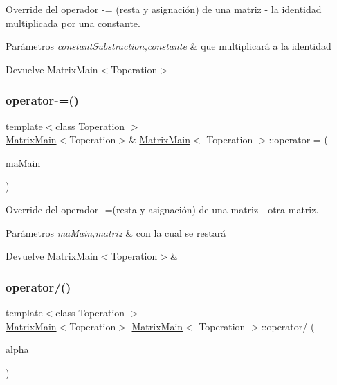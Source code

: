 Override del operador -\/= (resta y asignación) de una matriz -\/ la identidad multiplicada por una constante. 


\begin{DoxyParams}{Parámetros}
{\em constant\+Substraction,constante} & que multiplicará a la identidad \\
\hline
\end{DoxyParams}
\begin{DoxyReturn}{Devuelve}
Matrix\+Main$<$\+Toperation$>$ 
\end{DoxyReturn}
\mbox{\label{classMatrixMain_a9c12a483991f3b4d90f95e1ca09a4174}} 
\subsubsection{\texorpdfstring{operator-\/=()}{operator-=()}\hspace{0.1cm}{\footnotesize\ttfamily [2/2]}}
{\footnotesize\ttfamily template$<$class Toperation $>$ \\
\hyperlink{classMatrixMain}{Matrix\+Main}$<$Toperation$>$\& \hyperlink{classMatrixMain}{Matrix\+Main}$<$ Toperation $>$\+::operator-\/= (\begin{DoxyParamCaption}\item[{\hyperlink{classMatrixMain}{Matrix\+Main}$<$ Toperation $>$ \&}]{ma\+Main }\end{DoxyParamCaption})}



Override del operador -\/=(resta y asignación) de una matriz -\/ otra matriz. 


\begin{DoxyParams}{Parámetros}
{\em ma\+Main,matriz} & con la cual se restará \\
\hline
\end{DoxyParams}
\begin{DoxyReturn}{Devuelve}
Matrix\+Main$<$\+Toperation$>$\& 
\end{DoxyReturn}
\mbox{\label{classMatrixMain_aa18465b7a138010a03901c266f8aa306}} 
\subsubsection{\texorpdfstring{operator/()}{operator/()}}
{\footnotesize\ttfamily template$<$class Toperation $>$ \\
\hyperlink{classMatrixMain}{Matrix\+Main}$<$Toperation$>$ \hyperlink{classMatrixMain}{Matrix\+Main}$<$ Toperation $>$\+::operator/ (\begin{DoxyParamCaption}\item[{const Toperation \&}]{alpha }\end{DoxyParamCaption})}



